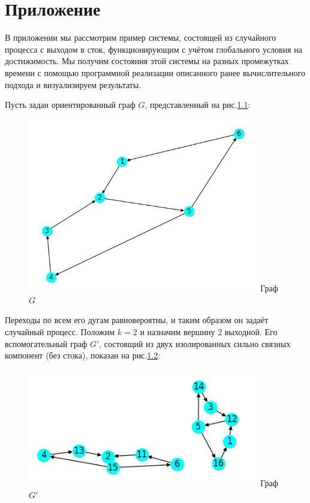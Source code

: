 \chapter{Приложение}

В приложении мы рассмотрим пример системы, состоящей из случайного процесса с выходом в сток, функционирующим с учётом глобального условия на достижимость. Мы получим состояния этой системы на разных промежутках времени с помощью программной реализации описанного ранее вычислительного подхода и визуализируем результаты. 

Пусть задан ориентированный граф $G$, представленный на рис.\ref{fig:pic_4}:

\begin{figure}
	\centering	
	{\includegraphics[width=0.9\textwidth]{img/4.png}}
	{Граф $G$}
	\label{fig:pic_4}
\end{figure}

Переходы по всем его дугам равновероятны, и таким образом он задаёт случайный процесс. Положим $k = 2$ и назначим вершину 2 выходной. Его вспомогательный граф $G'$, состоящий из двух изолированных сильно связных компонент (без стока), показан на рис.\ref{fig:pic_5}:

\begin{figure}
	\centering	
	{\includegraphics[width=0.9\textwidth]{img/5.png}}
	{Граф $G'$}
	\label{fig:pic_5}
\end{figure}
